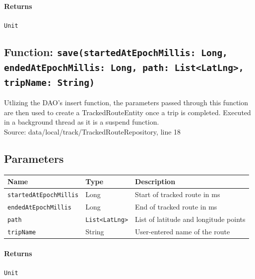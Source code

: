 \documentclass{article}
\begin{document}
                \paragraph{Returns} \texttt{Unit} 

            \hrulefill

            \subsection*{Function: \texttt{save(startedAtEpochMillis: Long, endedAtEpochMillis: Long, path: List<LatLng>, tripName: String)}}

                Utlizing the DAO's insert function, the parameters passed through this function
                are then used to create a TrackedRouteEntity once a trip is completed. Executed 
                in a background thread as it is a suspend function. \\
                Source: data/local/track/TrackedRouteRepository, line 18
                
                \subsection*{Parameters}

                \begin{tabular}{p{3cm} p{4cm} p{7cm}}
                \toprule
                \textbf{Name} & \textbf{Type} & \textbf{Description} \\ \midrule
                \texttt{startedAtEpochMillis} & Long & Start of tracked route in ms \\ \addlinespace
                \texttt{endedAtEpochMillis} & Long & End of tracked route in ms \\ \addlinespace
                \texttt{path} & \texttt{List<LatLng>} & List of latitude and longitude points \\ \addlinespace
                \texttt{tripName} & String & User-entered name of the route \\ \bottomrule
                \end{tabular}

                \paragraph{Returns} \texttt{Unit} 

            \hrulefill

            \newpage
\end{document}

